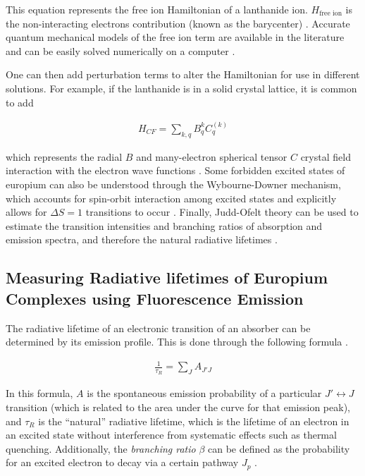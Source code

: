 This equation represents the free ion Hamiltonian of a lanthanide ion.
$H_{\text{free ion}}$ is the non-interacting electrons contribution (known as
the barycenter) \cite{Peijzel:2005jh}. Accurate quantum mechanical models of
the free ion term are available in the literature and can be easily solved
numerically on a computer \cite{Carnall:1989fc,Morrison:1988tw}.

One can then add perturbation terms to alter the Hamiltonian for use in
different solutions. For example, if the lanthanide is in a solid crystal
lattice, it is common to add

\begin{align*}
  H_{CF} = \sum_{k,q} B_q^k C_q^{(k)}
\end{align*}

which represents the radial $B$ and many-electron spherical tensor $C$ crystal
field interaction with the electron wave functions \cite{Peijzel:2005jh}.  Some
forbidden excited states of europium can also be understood through the
Wybourne-Downer mechanism, which accounts for spin-orbit interaction among
excited states and explicitly allows for $\Delta S = 1$ transitions to occur
\cite{Wybourne:1968ez,Downer:1988kz}.  Finally, Judd-Ofelt theory can be used
to estimate the transition intensities and branching ratios of absorption and
emission spectra, and therefore the natural radiative lifetimes
\cite{Werts:2002fs}.



\subsection{Measuring Radiative lifetimes of Europium Complexes using Fluorescence Emission}\label{subsec:rad_life}

The radiative lifetime of an electronic transition of an absorber can be
determined by its emission profile. This is done through the following formula
\cite{Werts:2002fs}.

\begin{align}
  \frac{1}{\tau_R} = \sum_JA_{J'J}\label{eq:nat_life_emiss}
\end{align}

In this formula, $A$ is the spontaneous emission probability of a particular
$J' \leftrightarrow J$ transition (which is related to the area under the curve for that
emission peak), and $\tau_R$ is the ``natural'' radiative lifetime, which
is the lifetime of an electron in an excited state without interference
from systematic effects such as thermal quenching. Additionally, the
\emph{branching ratio} $\beta$ can be defined as the probability for an
excited electron to decay via a certain pathway $J_p$ \cite{Werts:2002fs}.

